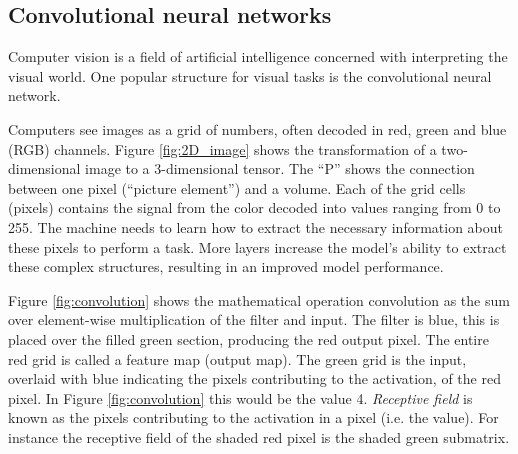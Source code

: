 \subsection{Convolutional neural networks} \label{sec:convolutional neural network}
Computer vision is a field of artificial intelligence concerned with interpreting the visual world. One popular structure for visual tasks is the convolutional neural network. %

Computers see images as a grid of numbers, often decoded in red, green and blue (RGB) channels. Figure \ref{fig:2D_image} shows the transformation of a two-dimensional image to a 3-dimensional tensor. The ``P'' shows the connection between one pixel (``picture element'') and a volume. Each of the grid cells (pixels) contains the signal from the color decoded into values ranging from 0 to 255. The machine needs to learn how to extract the necessary information about these pixels to perform a task. More layers increase the model's ability to extract these complex structures, resulting in an improved model performance. 

Figure \ref{fig:convolution} shows the mathematical operation convolution as the sum over element-wise multiplication of the filter and input. The filter is blue, this is placed over the filled green section, producing the red output pixel. The entire red grid is called a feature map (output map). The green grid is the input, overlaid with blue indicating the pixels contributing to the activation, of the red pixel. In Figure \ref{fig:convolution} this would be the value 4. \textit{Receptive field} is known as the pixels contributing to the activation in a pixel (i.e. the value). For instance the receptive field of the shaded red pixel is the shaded green submatrix.

